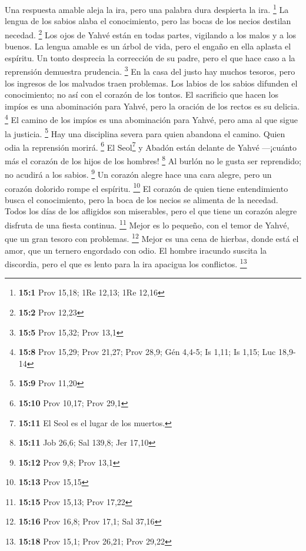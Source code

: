 \begin{paracol}{2}
 Una respuesta amable aleja la ira, pero una palabra dura
despierta la ira. \footnote{\textbf{15:1} Prov 15,18; 1Re 12,13; 1Re
  12,16}  La lengua de los sabios alaba el conocimiento,
pero las bocas de los necios destilan necedad. \footnote{\textbf{15:2}
  Prov 12,23}  Los ojos de Yahvé están en todas partes,
vigilando a los malos y a los buenos.  La lengua amable es
un árbol de vida, pero el engaño en ella aplasta el espíritu.
 Un tonto desprecia la corrección de su padre, pero el que
hace caso a la reprensión demuestra prudencia. \footnote{\textbf{15:5}
  Prov 15,32; Prov 13,1}  En la casa del justo hay muchos
tesoros, pero los ingresos de los malvados traen problemas.
 Los labios de los sabios difunden el conocimiento; no así
con el corazón de los tontos.  El sacrificio que hacen los
impíos es una abominación para Yahvé, pero la oración de los rectos es
su delicia. \footnote{\textbf{15:8} Prov 15,29; Prov 21,27; Prov 28,9;
  Gén 4,4-5; Is 1,11; Is 1,15; Luc 18,9-14}  El camino de
los impíos es una abominación para Yahvé, pero ama al que sigue la
justicia. \footnote{\textbf{15:9} Prov 11,20}  Hay una
disciplina severa para quien abandona el camino. Quien odia la
reprensión morirá. \footnote{\textbf{15:10} Prov 10,17; Prov 29,1}
 El Seol\footnote{\textbf{15:11} El Seol es el lugar de
  los muertos.} y Abadón están delante de Yahvé ---¡cuánto más el
corazón de los hijos de los hombres! \footnote{\textbf{15:11} Job 26,6;
  Sal 139,8; Jer 17,10}  Al burlón no le gusta ser
reprendido; no acudirá a los sabios. \footnote{\textbf{15:12} Prov 9,8;
  Prov 13,1}  Un corazón alegre hace una cara alegre,
pero un corazón dolorido rompe el espíritu. \footnote{\textbf{15:13}
  Prov 15,15}  El corazón de quien tiene entendimiento
busca el conocimiento, pero la boca de los necios se alimenta de la
necedad.  Todos los días de los afligidos son miserables,
pero el que tiene un corazón alegre disfruta de una fiesta continua.
\footnote{\textbf{15:15} Prov 15,13; Prov 17,22}  Mejor
es lo pequeño, con el temor de Yahvé, que un gran tesoro con problemas.
\footnote{\textbf{15:16} Prov 16,8; Prov 17,1; Sal 37,16}
 Mejor es una cena de hierbas, donde está el amor, que un
ternero engordado con odio.  El hombre iracundo suscita
la discordia, pero el que es lento para la ira apacigua los conflictos.
\footnote{\textbf{15:18} Prov 15,1; Prov 26,21; Prov 29,22}

\end{paracol}
